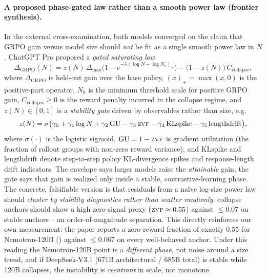 \paragraph{A proposed phase-gated law rather than a smooth power law (frontier synthesis).}
In the external cross-examination, both models converged on the claim that
GRPO gain versus model size should \emph{not} be fit as a single smooth power
law in $N$. ChatGPT Pro proposed a \emph{gated saturating law}
\begin{equation}
  \label{eq:frontier-gated}
  \Delta_{\mathrm{GRPO}}(N)
    = z(N)\,\Delta_{\max}\bigl(1 - e^{-\lambda(\log N - \log N_0)_+}\bigr)
      - \bigl(1 - z(N)\bigr)\,C_{\mathrm{collapse}},
\end{equation}
where $\Delta_{\mathrm{GRPO}}$ is held-out gain over the base policy, $(x)_+ = \max(x, 0)$ is the positive-part operator, $N_0$ is the minimum threshold scale for positive GRPO gain, $C_{\mathrm{collapse}} \ge 0$ is the reward penalty incurred in the collapse regime, and
$z(N)\in[0,1]$ is a \emph{stability gate} driven by observables rather than
size, e.g.
\begin{equation}
  \label{eq:frontier-gate}
  z(N) = \sigma\bigl(\gamma_0 + \gamma_1 \log N + \gamma_2\,\mathrm{GU}
         - \gamma_3\,\textsc{zvf} - \gamma_4\,\mathrm{KLspike}
         - \gamma_5\,\mathrm{lengthdrift}\bigr),
\end{equation}
where $\sigma(\cdot)$ is the logistic sigmoid, $\mathrm{GU} = 1 - \textsc{zvf}$ is gradient utilization (the fraction of rollout groups with non-zero reward variance), and $\mathrm{KLspike}$ and $\mathrm{lengthdrift}$ denote step-to-step policy KL-divergence spikes and response-length drift indicators.
The envelope says larger models raise the \emph{attainable} gain; the gate
says that gain is realized only inside a stable, contrastive-learning phase.
The concrete, falsifiable version is that residuals from a na\"ive log-size
power law should \emph{cluster by stability diagnostics rather than scatter
randomly}: collapse anchors should show a high zero-signal proxy
($\textsc{zvf}\approx 0.55$) against $\le 0.07$ on stable anchors -- an
order-of-magnitude separation. This directly reinforces our own measurement:
the paper reports a zero-reward fraction of exactly $0.55$ for Nemotron-120B
() against $\le 0.067$ on every
well-behaved anchor. Under this reading the Nemotron-120B point is a
\emph{different phase}, not noise around a size trend, and if DeepSeek-V3.1
(671B architectural / 685B total) is stable while 120B collapses, the instability is \emph{reentrant} in
scale, not monotone.

